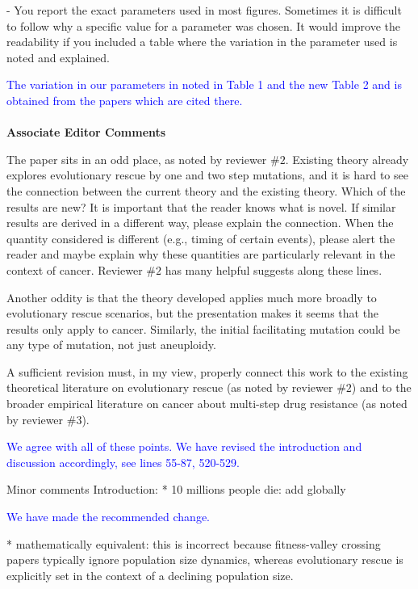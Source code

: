 \documentclass[12pt]{extarticle}
\begin{document}
- You report the exact parameters used in most figures. Sometimes it is difficult to follow why a specific value for a parameter was chosen. It would improve the readability if you included a table where the variation in the parameter used is noted and explained.

\textcolor{blue}{The variation in our parameters in noted in Table 1 and the new Table 2 and is obtained from the papers which are cited there.} 
\\\\
\textbf{Associate Editor Comments}

The paper sits in an odd place, as noted by reviewer $\#2$. Existing theory already explores evolutionary rescue by one and two step mutations, and it is hard to see the connection between the current theory and the existing theory. Which of the results are new? It is important that the reader knows what is novel. If similar results are derived in a different way, please explain the connection. When the quantity considered is different (e.g., timing of certain events), please alert the reader and maybe explain why these quantities are particularly relevant in the context of cancer. Reviewer $\#2$ has many helpful suggests along these lines.

Another oddity is that the theory developed applies much more broadly to evolutionary rescue scenarios, but the presentation makes it seems that the results only apply to cancer. Similarly, the initial facilitating mutation could be any type of mutation, not just aneuploidy.

A sufficient revision must, in my view, properly connect this work to the existing theoretical literature on evolutionary rescue (as noted by reviewer $\#2$) and to the broader empirical literature on cancer about multi-step drug resistance (as noted by reviewer $\#3$).

\textcolor{blue}{
We agree with all of these points. We have revised the introduction and discussion accordingly, see lines 55-87, 520-529.
}

Minor comments
Introduction:
* 10 millions people die: add globally

\textcolor{blue}{We have made the recommended change. }  %

* mathematically equivalent: this is incorrect because fitness-valley crossing papers typically ignore population size dynamics, whereas evolutionary rescue is explicitly set in the context of a declining population size.
\end{document}

